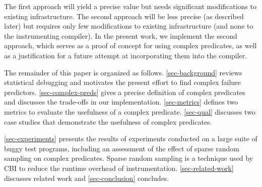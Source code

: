 The first approach will yield a precise value but needs significant modifications to existing infrastructure.  The second approach will be less precise (as described later) but requires only few modifications to existing infrastructure (and none to the instrumenting compiler).  In the present work, we implement the second approach, which serves as a proof of concept for using complex predicates, as well as a justification for a future attempt at incorporating them into the compiler.

The remainder of this paper is organized as follows.  \autoref{sec-background} reviews statistical debugging and motivates the present effort to find complex failure predictors.  \autoref{sec-complex-preds} gives a precise definition of complex predicates and discusses the trade-offs in our implementation.  \autoref{sec-metrics} defines two metrics to evaluate the usefulness of a complex predicate.  \autoref{sec-qual} discusses two case studies that demonstrate the usefulness of complex predicates.

\autoref{sec-experiments} presents the results of experiments conducted on a large suite of buggy test programs, including an assessment of the effect of sparse random sampling on complex predicates.  Sparse random sampling is a technique used by CBI to reduce the runtime overhead of instrumentation.  \autoref{sec-related-work} discusses related work and \autoref{sec-conclusion} concludes.
